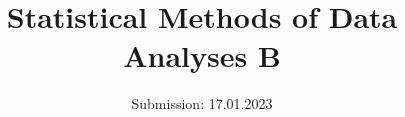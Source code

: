 

\subject{Sheet 7}
\title{Statistical Methods of Data Analyses B}
\date{
  Submission: 17.01.2023
}


\maketitle





